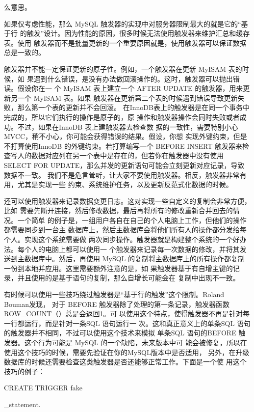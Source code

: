 么意思。

如果仅考虑性能，那么 MySQL 触发器的实现中对服务器限制最大的就是它的“基于行
的触发”设计。因为性能的原因，很多时候无法使用触发器来维护汇总和缓存表。使用
触发器而不是批量更新的一个重要原因就是，使用触发器可以保证数据总是一致的。

触发器并不能一定保证更新的原子性。例如，一个触发器在更新 MyISAM 表的时候，如
果遇到什么错误，是没有办法做回滚操作的。这时，触发器可以抛出错误。假设你在一
个 MyISAM 表上建立一个 AFTER UPDATE 的触发器，用来更新另一个 MyISAM 表。如果
触发器在更新第二个表的时候遇到错误导致更新失败，那么第一个表的更新并不会回滚。
在InnoDB表上的触发器是在同一个事务中完成的，所以它们执行的操作是原子的，原
操作和触发器操作会同时失败或者成功。不过，如果在InnoDB 表上建触发器去检查数
据的一致性，需要特别小心MVCC，稍不小心，你可能会获得错误的结果。假设，你想
实现外键约束，但是不打算使用InnoDB 的外键约束。若打算编写一个 BEFORE INSERT
触发器来检查写人的数据对应列在另一个表中是存在的，但若你在触发器中没有使用
SELECT FOR UPDATE，那么并发的更新语句可能会立刻更新对应记录，导致数据不一致。
我们不是危言耸听，让大家不要使用触发器。相反，触发器非常有用，尤其是实现一些
约束、系统维护任务，以及更新反范式化数据的时候。

还可以使用触发器来记录数据变更日志。这对实现一些自定义的复制会非常方便，比如
需要先断开连接，然后修改数据，最后再将所有的修改重新合并回去的情况。一个简单
的例子是，一组用户各自在自己的个人电脑上工作，但他们的操作都需要同步到一台主
数据库上，然后主数据库会将他们所有人的操作都分发给每个人。实现这个系统需要做
两次同步操作。触发器就是构建整个系统的一个好办法。每个人的电脑上都可以使用一
个触发器来记录每一次数据的修改，并将其发送到主数据库中。然后，再使用 MySQL
的复制将主数据库上的所有操作都复制一份到本地并应用。这里需要额外注意的是，如
果触发器基于有自增主键的记录，并且使用的是基于语句的复制，那么自增长可能会在
复制中出现不一致。

有时候可以使用一些技巧绕过触发器是“基于行的触发”这个限制。Roland Bouman发现，
对于 BEFORE 触发器除了处理的第一条记录，触发器函数ROW\_COUNT（）总是会返回1。可
以使用这个特点，使得触发器不再是针对每一行都运行，而是针对一条SQL 语句运行一
次。这和真正意义上的单条SQL 语句的触发器并不相同，不过可以使用这个技术来模拟
单条SQL 语句的BEFORE 触发器。这个行为可能是 MySQL 的一个缺陷，未来版本中可
能会被修复，所以在使用这个技巧的时候，需要先验证在你的MySQL版本中是否适用，
另外，在升级数据库的时候还需要检查这类触发器是否还能够正常工作。下面是一个使
用这个技巧的例子：

CREATE TRIGGER fake

\_statement.

